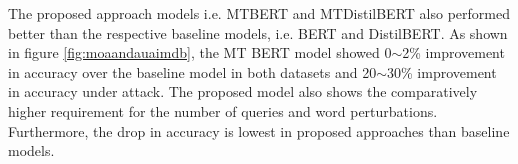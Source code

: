 \documentclass[%
	BCOR=8mm, %
	DIV=12,
	toc=bibliography, %
	toc=listof, %
	oneside, %
	egregdoesnotlikesansseriftitles, %
	]{scrbook}
\begin{document}
The proposed approach models i.e. MTBERT and MTDistilBERT also performed better than the respective baseline models, i.e. BERT and DistilBERT.  As shown in figure \ref{fig:moaandauaimdb}, the MT BERT model showed 0$\sim$2\% improvement in accuracy over the baseline model in both datasets and 20$\sim$30\% improvement in accuracy under attack. The proposed model also shows the comparatively higher requirement for the number of queries and word perturbations. Furthermore, the drop in accuracy is lowest in proposed approaches than baseline models.
\end{document}
